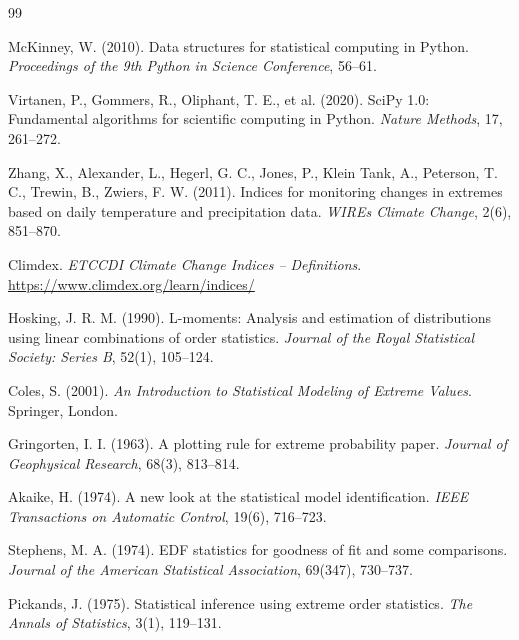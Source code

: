 {}

\begingroup
{}
\begin{thebibliography}{99}

McKinney, W. (2010). Data structures for statistical computing in Python. \textit{Proceedings of the 9th Python in Science Conference}, 56--61.

Virtanen, P., Gommers, R., Oliphant, T. E., et al. (2020). SciPy 1.0: Fundamental algorithms for scientific computing in Python. \textit{Nature Methods}, 17, 261--272.

Zhang, X., Alexander, L., Hegerl, G. C., Jones, P., Klein Tank, A., Peterson, T. C., Trewin, B., Zwiers, F. W. (2011). Indices for monitoring changes in extremes based on daily temperature and precipitation data. \textit{WIREs Climate Change}, 2(6), 851--870.

Climdex. \textit{ETCCDI Climate Change Indices -- Definitions}. \url{https://www.climdex.org/learn/indices/}

Hosking, J. R. M. (1990). L-moments: Analysis and estimation of distributions using linear combinations of order statistics. \textit{Journal of the Royal Statistical Society: Series B}, 52(1), 105--124.

Coles, S. (2001). \textit{An Introduction to Statistical Modeling of Extreme Values}. Springer, London.

Gringorten, I. I. (1963). A plotting rule for extreme probability paper. \textit{Journal of Geophysical Research}, 68(3), 813--814.

Akaike, H. (1974). A new look at the statistical model identification. \textit{IEEE Transactions on Automatic Control}, 19(6), 716--723.

Stephens, M. A. (1974). EDF statistics for goodness of fit and some comparisons. \textit{Journal of the American Statistical Association}, 69(347), 730--737.

Pickands, J. (1975). Statistical inference using extreme order statistics. \textit{The Annals of Statistics}, 3(1), 119--131.


\end{thebibliography}
